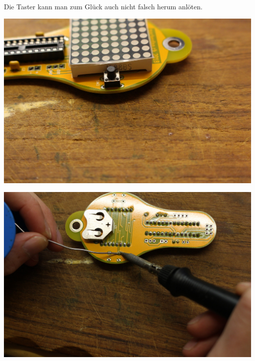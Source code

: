 \documentclass{article}
\begin{document}
Die Taster kann man zum Glück auch nicht falsch herum anlöten.

\vspace{1cm}

\begin{minipage}[b]{0.5\textwidth}
	\includegraphics[width=\textwidth]{Bilder/IMG_5587.JPG}
\end{minipage}
\begin{minipage}[b]{0.5\textwidth}
	\includegraphics[width=\textwidth]{Bilder/IMG_5588.JPG}
\end{minipage}

\vspace{0.5cm}
\end{document}
